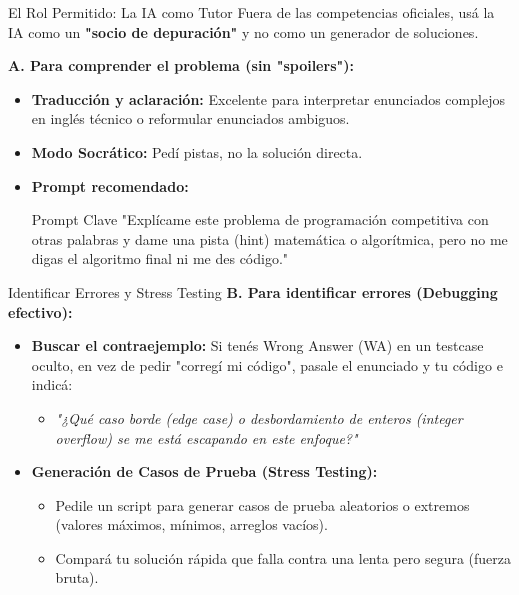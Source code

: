 \documentclass{beamer}
\begin{document}
\begin{frame}{El Rol Permitido: La IA como Tutor}
  Fuera de las competencias oficiales, usá la IA como un \textbf{"socio de depuración"} y no como un generador de soluciones.
  
  \vspace{0.3cm}
  \textbf{A. Para comprender el problema (sin "spoilers"):}
  \begin{itemize}
    \item \textbf{Traducción y aclaración:} Excelente para interpretar enunciados complejos en inglés técnico o reformular enunciados ambiguos.
    \item \textbf{Modo Socrático:} Pedí pistas, no la solución directa.
    \item \textbf{Prompt recomendado:} 
      \begin{alertblock}{Prompt Clave}
        \scriptsize
        "Explícame este problema de programación competitiva con otras palabras y dame una pista (hint) matemática o algorítmica, pero no me digas el algoritmo final ni me des código."
      \end{alertblock}
  \end{itemize}
\end{frame}

\begin{frame}{Identificar Errores y Stress Testing}
  \textbf{B. Para identificar errores (Debugging efectivo):}
  \begin{itemize}
    \item \textbf{Buscar el contraejemplo:} Si tenés Wrong Answer (WA) en un testcase oculto, en vez de pedir "corregí mi código", pasale el enunciado y tu código e indicá:
      \begin{itemize}
        \item \textit{"¿Qué caso borde (edge case) o desbordamiento de enteros (integer overflow) se me está escapando en este enfoque?"}
      \end{itemize}
    \item \textbf{Generación de Casos de Prueba (Stress Testing):}
      \begin{itemize}
        \item Pedile un script para generar casos de prueba aleatorios o extremos (valores máximos, mínimos, arreglos vacíos).
        \item Compará tu solución rápida que falla contra una lenta pero segura (fuerza bruta).
      \end{itemize}
  \end{itemize}
\end{frame}
\end{document}
